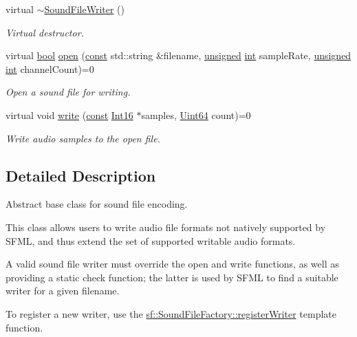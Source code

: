 \begin{DoxyCompactItemize}
virtual \hyperlink{classsf_1_1_sound_file_writer_a76944fc158688f35050bd5b592c90270}{$\sim$\-Sound\-File\-Writer} ()
\begin{DoxyCompactList}\small\item\em Virtual destructor. \end{DoxyCompactList}\item 
virtual \hyperlink{term__entry_8h_a002004ba5d663f149f6c38064926abac}{bool} \hyperlink{classsf_1_1_sound_file_writer_a5c92bcaaa880ef4d3eaab18dae1d3d07}{open} (\hyperlink{term__entry_8h_a57bd63ce7f9a353488880e3de6692d5a}{const} std\-::string \&filename, \hyperlink{curses_8priv_8h_aca40206900cfc164654362fa8d4ad1e6}{unsigned} \hyperlink{term__entry_8h_ad65b480f8c8270356b45a9890f6499ae}{int} sample\-Rate, \hyperlink{curses_8priv_8h_aca40206900cfc164654362fa8d4ad1e6}{unsigned} \hyperlink{term__entry_8h_ad65b480f8c8270356b45a9890f6499ae}{int} channel\-Count)=0
\begin{DoxyCompactList}\small\item\em Open a sound file for writing. \end{DoxyCompactList}\item 
virtual void \hyperlink{classsf_1_1_sound_file_writer_a4ce597e7682d22c5b2c98d77e931a1da}{write} (\hyperlink{term__entry_8h_a57bd63ce7f9a353488880e3de6692d5a}{const} \hyperlink{namespacesf_a3c8e10435e2a310a7741755e66b5c94e}{Int16} $\ast$samples, \hyperlink{namespacesf_add9ac83466d96b9f50a009b9f4064266}{Uint64} count)=0
\begin{DoxyCompactList}\small\item\em Write audio samples to the open file. \end{DoxyCompactList}\end{DoxyCompactItemize}


\subsection{Detailed Description}
Abstract base class for sound file encoding. 

This class allows users to write audio file formats not natively supported by S\-F\-M\-L, and thus extend the set of supported writable audio formats.

A valid sound file writer must override the open and write functions, as well as providing a static check function; the latter is used by S\-F\-M\-L to find a suitable writer for a given filename.

To register a new writer, use the \hyperlink{classsf_1_1_sound_file_factory_a3a59140e6ccf1f252f721b790eddd661}{sf\-::\-Sound\-File\-Factory\-::register\-Writer} template function.

